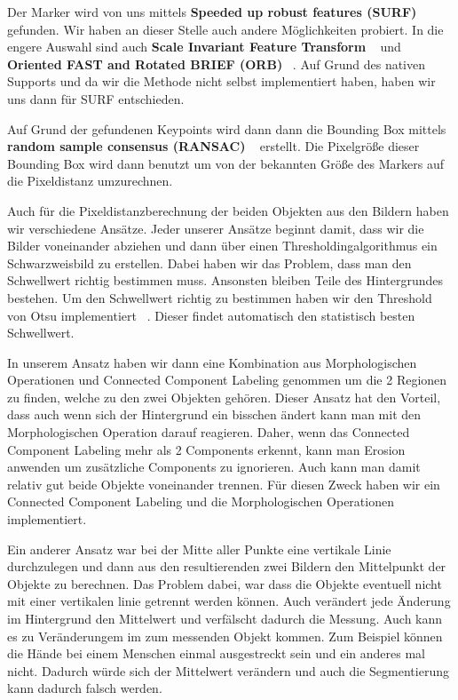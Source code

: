 \documentclass[deutsch]{scrartcl}
\begin{document}
Der Marker wird von uns mittels \textbf{Speeded up robust features (SURF)} ~\cite{bay2006surf} gefunden. Wir haben an dieser Stelle auch andere Möglichkeiten probiert. In die engere Auswahl sind auch \textbf{Scale Invariant Feature Transform} ~\cite{lowe2004distinctive} und \textbf{Oriented FAST and Rotated BRIEF (ORB)} ~\cite{rublee2011orb}. Auf Grund des nativen Supports und da wir die Methode nicht selbst implementiert haben, haben wir uns dann für SURF entschieden. 

Auf Grund der gefundenen Keypoints wird dann dann die Bounding Box mittels \textbf{random sample consensus (RANSAC)} ~\cite{fischler1981random} erstellt. Die Pixelgröße dieser Bounding Box wird dann benutzt um von der bekannten Größe des Markers auf die Pixeldistanz umzurechnen.

Auch für die Pixeldistanzberechnung der beiden Objekten aus den Bildern haben wir verschiedene Ansätze. Jeder unserer Ansätze beginnt damit, dass wir die Bilder voneinander abziehen und dann über einen Thresholdingalgorithmus ein Schwarzweisbild zu erstellen. Dabei haben wir das Problem, dass man den Schwellwert richtig bestimmen muss. Ansonsten bleiben Teile des Hintergrundes bestehen. Um den Schwellwert richtig zu bestimmen haben wir den Threshold von Otsu implementiert ~\cite{otsu1975threshold}. Dieser findet automatisch den statistisch besten Schwellwert. 

In unserem Ansatz haben wir dann eine Kombination aus Morphologischen Operationen und Connected Component Labeling genommen um die 2 Regionen zu finden, welche zu den zwei Objekten gehören. Dieser Ansatz hat den Vorteil, dass auch wenn sich der Hintergrund ein bisschen ändert kann man mit den Morphologischen Operation darauf reagieren. Daher, wenn das Connected Component Labeling mehr als 2 Components erkennt, kann man Erosion anwenden um zusätzliche Components zu ignorieren. Auch kann man damit relativ gut beide Objekte voneinander trennen. Für diesen Zweck haben wir ein Connected Component Labeling und die Morphologischen Operationen ~\cite{haralick1987image} implementiert.

Ein anderer Ansatz war bei der Mitte aller Punkte eine vertikale Linie durchzulegen und dann aus den resultierenden zwei Bildern den Mittelpunkt der Objekte zu berechnen. Das Problem dabei, war dass die Objekte eventuell nicht mit einer vertikalen linie getrennt werden können. Auch verändert jede Änderung im Hintergrund den Mittelwert und verfälscht dadurch die Messung. Auch kann es zu Veränderungem im zum messenden Objekt kommen. Zum Beispiel können die Hände bei einem Menschen einmal ausgestreckt sein und ein anderes mal nicht. Dadurch würde sich der Mittelwert verändern und auch die Segmentierung kann dadurch falsch werden.
\end{document}
